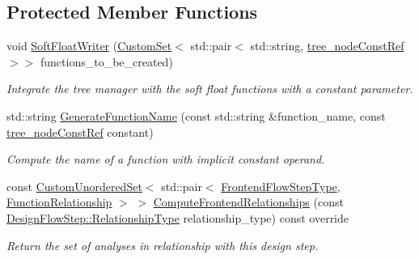 \subsection*{Protected Member Functions}
\begin{DoxyCompactItemize}
\item 
void \hyperlink{classconstant__flop__wrapper_ad0bd18ed1418f981c85cb550f8453462}{Soft\+Float\+Writer} (\hyperlink{custom__set_8hpp_a615bc2f42fc38a4bb1790d12c759e86f}{Custom\+Set}$<$ std\+::pair$<$ std\+::string, \hyperlink{tree__node_8hpp_a3cf5d02292c940f3892425a5b5fdec3c}{tree\+\_\+node\+Const\+Ref} $>$$>$ functions\+\_\+to\+\_\+be\+\_\+created)
\begin{DoxyCompactList}\small\item\em Integrate the tree manager with the soft float functions with a constant parameter. \end{DoxyCompactList}\item 
std\+::string \hyperlink{classconstant__flop__wrapper_a3932918373450f7c7a399b89488a7ec8}{Generate\+Function\+Name} (const std\+::string \&function\+\_\+name, const \hyperlink{tree__node_8hpp_a3cf5d02292c940f3892425a5b5fdec3c}{tree\+\_\+node\+Const\+Ref} constant)
\begin{DoxyCompactList}\small\item\em Compute the name of a function with implicit constant operand. \end{DoxyCompactList}\item 
const \hyperlink{classCustomUnorderedSet}{Custom\+Unordered\+Set}$<$ std\+::pair$<$ \hyperlink{frontend__flow__step_8hpp_afeb3716c693d2b2e4ed3e6d04c3b63bb}{Frontend\+Flow\+Step\+Type}, \hyperlink{classFrontendFlowStep_af7cf30f2023e5b99e637dc2058289ab0}{Function\+Relationship} $>$ $>$ \hyperlink{classconstant__flop__wrapper_ac777a3cbc3fa01f98f7e2df0465a3451}{Compute\+Frontend\+Relationships} (const \hyperlink{classDesignFlowStep_a723a3baf19ff2ceb77bc13e099d0b1b7}{Design\+Flow\+Step\+::\+Relationship\+Type} relationship\+\_\+type) const override
\begin{DoxyCompactList}\small\item\em Return the set of analyses in relationship with this design step. \end{DoxyCompactList}\end{DoxyCompactItemize}
